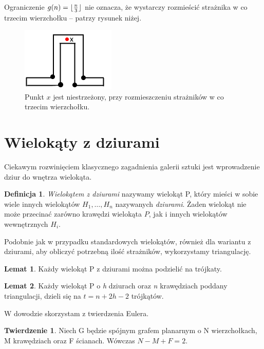 \documentclass[brudnopis]{xmgr}
\DeclarePairedDelimiter\floor{\lfloor}{\rfloor}
\theoremstyle{definition}
\newtheorem{Twierdzenie}{Twierdzenie}
\newtheorem{Lemat}{Lemat}
\newtheorem{Definicja}{Definicja}
\begin{document}
\newpage\indent Ograniczenie $g(n) = \floor{\frac{n}{3}}$ nie oznacza, że wystarczy rozmieścić strażnika w co trzecim wierzchołku -- patrzy rysunek niżej.
\begin{figure}[ht!]
  \centering
  \includegraphics{rysunki/co_trzeci.png}
  \caption{Punkt $x$ jest niestrzeżony, przy rozmieszczeniu strażników w co trzecim wierzchołku.}
\end{figure} 

\section{Wielokąty z dziurami}
Ciekawym rozwinięciem klasycznego zagadnienia galerii sztuki jest wprowadzenie dziur do wnętrza wielokąta.

\begin{Definicja} \label{def wielokat z dziurami}
  \emph{Wielokątem z dziurami} nazywamy wielokąt P, który mieści w sobie wiele innych wielokątów $H_1, \ldots, H_n$ nazywanych \emph{dziurami}. Żaden wielokąt nie może przecinać zarówno krawędzi wielokąta $P$, jak i innych wielokątów wewnętrznych $H_i$.
\end{Definicja}

\indent Podobnie jak w przypadku standardowych wielokątów, również dla wariantu z dziurami, aby obliczyć potrzebną ilość strażników, wykorzystamy triangulację.

\begin{Lemat} \cite{orourke}
  Każdy wielokąt P z dziurami można podzielić na trójkaty.
\end{Lemat}

\begin{Lemat}\label{t trójkątów triangulacja} \cite{orourke}
  Każdy wielokąt P o \emph{h} dziurach oraz \emph{n} krawędziach poddany triangulacji, dzieli się na $t = n + 2h - 2$ trójkątów.
\end{Lemat}

W dowodzie skorzystam z twierdzenia Eulera.
\begin{Twierdzenie}\label{tw eulera}
  Niech G będzie spójnym grafem planarnym o N wierzchołkach, M krawędziach oraz F ścianach. Wówczas $N - M + F = 2$.
\end{Twierdzenie}
\end{document}
